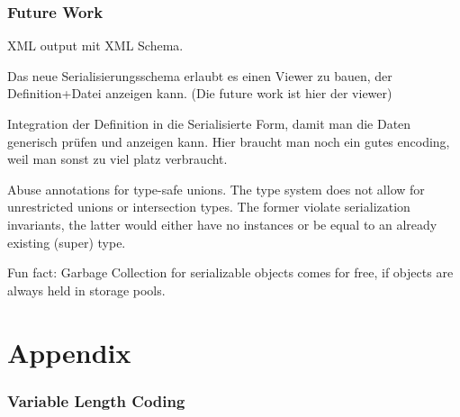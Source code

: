 \documentclass[a4paper,10pt]{article}
\begin{document}

\section{Future Work}

XML output mit XML Schema.

Das neue Serialisierungsschema erlaubt es einen Viewer zu bauen, der Definition+Datei anzeigen kann. (Die future work ist hier der viewer)

Integration der Definition in die Serialisierte Form, damit man die Daten generisch prüfen und anzeigen kann. Hier braucht man noch ein gutes encoding, weil man sonst zu viel platz verbraucht.

Abuse annotations for type-safe unions. The type system does not allow for unrestricted unions or intersection types. The former violate serialization invariants, the latter would either have no instances or be equal to an already existing (super) type.

Fun fact: Garbage Collection for serializable objects comes for free, if objects are always held in storage pools.

\newpage
\todos

\part{Appendix}
\renewcommand\thesection{\Alph{section}}
\setcounter{section}{0}
\section{Variable Length Coding}
\end{document}
